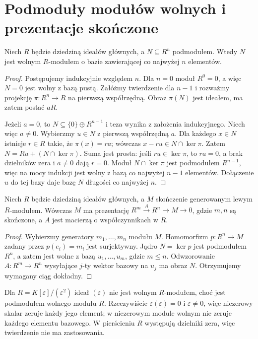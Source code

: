 \section{Podmoduły modułów wolnych i prezentacje skończone}
\begin{twierdzenie}
\label{aa:tw:pid-submodule-free}
Niech $R$ będzie dziedziną ideałów głównych, a $N\subseteq R^n$
podmodułem. Wtedy $N$ jest wolnym $R$-modułem o bazie zawierającej
co najwyżej $n$ elementów.
\end{twierdzenie}
\begin{proof}
Postępujemy indukcyjnie względem $n$. Dla $n=0$ moduł $R^0=0$,
a więc $N=0$ jest wolny z bazą pustą. Załóżmy twierdzenie dla $n-1$
i rozważmy projekcję $\pi:R^n\to R$ na pierwszą współrzędną.
Obraz $\pi(N)$ jest ideałem, ma zatem postać $aR$.

Jeżeli $a=0$, to $N\subseteq\{0\}\oplus R^{n-1}$ i teza wynika
z założenia indukcyjnego. Niech więc $a\ne0$. Wybierzmy $u\in N$
z pierwszą współrzędną $a$. Dla każdego $x\in N$ istnieje $r\in R$
takie, że $\pi(x)=ra$; wówczas $x-ru\in N\cap\ker\pi$.
Zatem $N=Ru+(N\cap\ker\pi)$. Suma jest prosta: jeśli
$ru\in\ker\pi$, to $ra=0$, a brak dzielników zera i $a\ne0$
dają $r=0$. Moduł $N\cap\ker\pi$ jest podmodułem $R^{n-1}$,
więc na mocy indukcji jest wolny z bazą co najwyżej $n-1$ elementów.
Dołączenie $u$ do tej bazy daje bazę $N$ długości co najwyżej $n$.
\end{proof}

\begin{wniosek}
\label{aa:wn:pid-finite-presentation}
Niech $R$ będzie dziedziną ideałów głównych, a $M$
skończenie generowanym lewym $R$-modułem.
Wówczas $M$ ma prezentację
$R^m\xrightarrow{A}R^n\longrightarrow M\longrightarrow0$,
gdzie $m,n$ są skończone, a $A$ jest macierzą o współczynnikach w $R$.
\end{wniosek}
\begin{proof}
Wybierzmy generatory $m_1,\dots,m_n$ modułu $M$. Homomorfizm
$p:R^n\to M$ zadany przez $p(e_i)=m_i$ jest surjektywny.
Jądro $N=\ker p$ jest podmodułem $R^n$, a zatem jest wolne
z bazą $u_1,\dots,u_m$, gdzie $m\le n$. Odwzorowanie
$A:R^m\to R^n$ wysyłające $j$-ty wektor bazowy na $u_j$
ma obraz $N$. Otrzymujemy wymagany ciąg dokładny.
\end{proof}

\begin{uwaga}
Dla $R=K[\varepsilon]/(\varepsilon^2)$ ideał $(\varepsilon)$
nie jest wolnym $R$-modułem, choć jest podmodułem wolnego modułu $R$.
Rzeczywiście $\varepsilon(\varepsilon)=0$ i $\varepsilon\ne0$,
więc niezerowy skalar zeruje każdy jego element; w niezerowym
module wolnym nie zeruje każdego elementu bazowego. W pierścieniu
$R$ występują dzielniki zera, więc twierdzenie nie ma zastosowania.
\end{uwaga}

